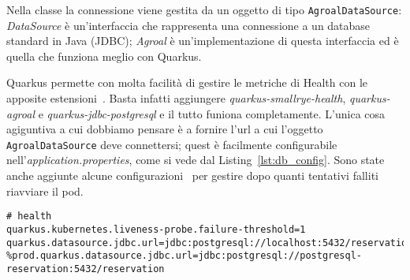 \myskip

Nella classe la connessione viene gestita da un oggetto di tipo \texttt{AgroalDataSource}\cite{quarkus_datasource}: \textit{DataSource} è un'interfaccia che rappresenta una connessione a un database standard in Java (JDBC); \textit{Agroal} è un'implementazione di questa interfaccia ed è quella che funziona meglio con Quarkus.

Quarkus permette con molta facilità di gestire le metriche di Health con le apposite estensioni~\cite{quarkus_health}. Basta infatti aggiungere \textit{quarkus-smallrye-health}, \textit{quarkus-agroal} e \textit{quarkus-jdbc-postgresql} e il tutto funiona completamente. L'unica cosa agiguntiva a cui dobbiamo pensare è a fornire l'url a cui l'oggetto \texttt{AgroalDataSource} deve connettersi; quest è facilmente configurabile nell'\textit{application.properties}, come si vede dal Listing~\ref{lst:db_config}. Sono state anche aggiunte alcune configurazioni~\cite{quarkus_all_config} per gestire dopo quanti tentativi falliti riavviare il pod.
\begin{lstlisting}[caption=JDBC configuration., label=lst:db_config]
# health
quarkus.kubernetes.liveness-probe.failure-threshold=1
quarkus.datasource.jdbc.url=jdbc:postgresql://localhost:5432/reservation
%prod.quarkus.datasource.jdbc.url=jdbc:postgresql://postgresql-reservation:5432/reservation
\end{lstlisting}